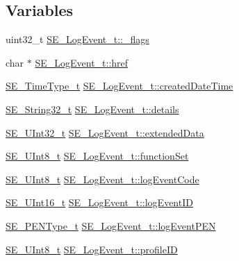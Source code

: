 \subsection*{Variables}
\begin{DoxyCompactItemize}
\item 
uint32\+\_\+t \hyperlink{group__LogEvent_ga7097aa812a92768f9a6444ad1f44e7ab}{S\+E\+\_\+\+Log\+Event\+\_\+t\+::\+\_\+flags}
\item 
char $\ast$ \hyperlink{group__LogEvent_ga7a77c2d8bf99665d52ad8a077c62892b}{S\+E\+\_\+\+Log\+Event\+\_\+t\+::href}
\item 
\hyperlink{group__TimeType_ga6fba87a5b57829b4ff3f0e7638156682}{S\+E\+\_\+\+Time\+Type\+\_\+t} \hyperlink{group__LogEvent_gacaa033ae90debff32b1e3d913b02b1e0}{S\+E\+\_\+\+Log\+Event\+\_\+t\+::created\+Date\+Time}
\item 
\hyperlink{group__String32_gac9f59b06b168b4d2e0d45ed41699af42}{S\+E\+\_\+\+String32\+\_\+t} \hyperlink{group__LogEvent_gab8efc7faed19706fb29eae8aaae704e3}{S\+E\+\_\+\+Log\+Event\+\_\+t\+::details}
\item 
\hyperlink{group__UInt32_ga70bd4ecda3c0c85d20779d685a270cdb}{S\+E\+\_\+\+U\+Int32\+\_\+t} \hyperlink{group__LogEvent_ga335ea28cf8492d2ae95aaa2af959d78b}{S\+E\+\_\+\+Log\+Event\+\_\+t\+::extended\+Data}
\item 
\hyperlink{group__UInt8_gaf7c365a1acfe204e3a67c16ed44572f5}{S\+E\+\_\+\+U\+Int8\+\_\+t} \hyperlink{group__LogEvent_gae3dd072a18ca3eab7d466064a072a2ed}{S\+E\+\_\+\+Log\+Event\+\_\+t\+::function\+Set}
\item 
\hyperlink{group__UInt8_gaf7c365a1acfe204e3a67c16ed44572f5}{S\+E\+\_\+\+U\+Int8\+\_\+t} \hyperlink{group__LogEvent_ga94b54840b21fa653aa8a15407470e017}{S\+E\+\_\+\+Log\+Event\+\_\+t\+::log\+Event\+Code}
\item 
\hyperlink{group__UInt16_gac68d541f189538bfd30cfaa712d20d29}{S\+E\+\_\+\+U\+Int16\+\_\+t} \hyperlink{group__LogEvent_ga88d7a251a6ed7939d961c7bc7e9071f4}{S\+E\+\_\+\+Log\+Event\+\_\+t\+::log\+Event\+ID}
\item 
\hyperlink{group__PENType_ga75343bbeec563c431fef2977b4dfa4e9}{S\+E\+\_\+\+P\+E\+N\+Type\+\_\+t} \hyperlink{group__LogEvent_ga3b9a19af528c15c42d19845194d6d859}{S\+E\+\_\+\+Log\+Event\+\_\+t\+::log\+Event\+P\+EN}
\item 
\hyperlink{group__UInt8_gaf7c365a1acfe204e3a67c16ed44572f5}{S\+E\+\_\+\+U\+Int8\+\_\+t} \hyperlink{group__LogEvent_ga2e3fe4dcccd980fb39556aca65124b51}{S\+E\+\_\+\+Log\+Event\+\_\+t\+::profile\+ID}
\end{DoxyCompactItemize}


